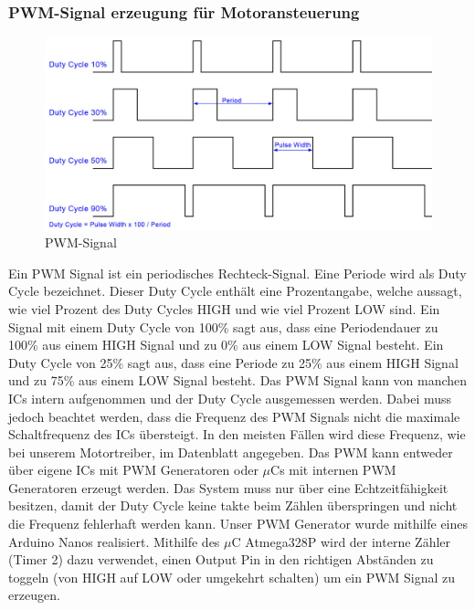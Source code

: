 \subsubsection{PWM-Signal erzeugung für Motoransteuerung}
\begin{figure}[H] 
\begin{center}

\includegraphics[width=12cm]{Bilder/PWM/Duty_Cycle}
\caption{PWM-Signal}
\label{PWM_Signal}

\end{center}
\end{figure}
Ein PWM Signal ist ein periodisches Rechteck-Signal. Eine Periode wird als Duty Cycle bezeichnet. Dieser Duty Cycle enthält eine Prozentangabe, welche aussagt, wie viel Prozent des Duty Cycles HIGH und wie viel Prozent LOW sind. Ein Signal mit einem Duty Cycle von 100\% sagt aus, dass eine Periodendauer zu 100\% aus einem HIGH Signal und zu 0\% aus einem LOW Signal besteht. Ein Duty Cycle von 25\% sagt aus, dass eine Periode zu 25\% aus einem HIGH Signal und zu 75\% aus einem LOW Signal besteht. Das PWM Signal kann von manchen ICs intern aufgenommen und der Duty Cycle ausgemessen werden. Dabei muss jedoch beachtet werden, dass die Frequenz des PWM Signals nicht die maximale Schaltfrequenz des ICs übersteigt. In den meisten Fällen wird diese Frequenz, wie bei unserem Motortreiber, im Datenblatt angegeben. Das PWM kann entweder über eigene ICs mit PWM Generatoren oder $\mu$Cs mit internen PWM Generatoren erzeugt werden. Das System muss nur über eine Echtzeitfähigkeit besitzen, damit der Duty Cycle keine takte beim Zählen überspringen und nicht die Frequenz fehlerhaft werden kann. 
Unser PWM Generator wurde mithilfe eines Arduino Nanos realisiert. Mithilfe des $\mu$C Atmega328P wird der interne Zähler (Timer 2) dazu verwendet, einen Output Pin in den richtigen Abständen zu toggeln (von HIGH auf LOW oder umgekehrt schalten) um ein PWM Signal zu erzeugen.


